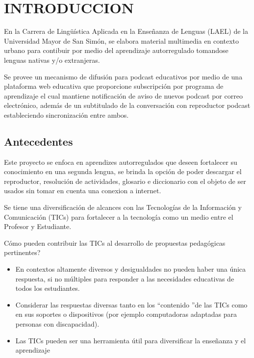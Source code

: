\chapter{INTRODUCCION}

En la Carrera de Ling\"{u}\'{i}stica Aplicada en la Ense\~{n}anza de Lenguas 
(LAEL) de la Universidad Mayor de San Sim\'{o}n, se elabora material
multimedia en contexto urbano para contibuir por medio del aprendizaje 
autorregulado tomandose lenguas nativas y/o extranjeras.

Se provee un mecanismo de difusi\'{o}n para podcast educativos por medio de una
plataforma web educativa que proporcione subscripci\'{o}n por programa de 
aprendizaje el cual mantiene notificaci\'{o}n de aviso de nuevos podcast por 
correo electr\'{o}nico, adem\'{a}s de un subtitulado de la conversaci\'{o}n 
con reproductor podcast estableciendo sincronizaci\'{o}n entre ambos.

\section{Antecedentes}

Este proyecto se enfoca en aprendizes autorregulados que deseen fortalecer
su conocimiento en una segunda lengua, se brinda la opci\'{o}n de poder 
descargar el reproductor, resoluci\'{o}n de actividades, glosario e diccionario
con el objeto de ser usados sin tomar en cuenta una conexion a internet. 

Se tiene una diversificaci\'{o}n de alcances con las Tecnolog\'{i}as de la 
Informaci\'{o}n y Comunicaci\'{o}n (TICs) para fortalecer a la
tecnolog\'{i}a como un medio entre el Profesor y Estudiante.

\textquestiondown C\'{o}mo pueden contribuir las TICs al desarrollo de propuestas
pedag\'{o}gicas pertinentes? 
\cite{severin2013enfoques}

\begin{itemize}

\item En contextos altamente diversos y desigualdades no pueden haber una 
\'{u}nica respuesta, si no m\'{u}ltiples para responder a las necesidades 
educativas de todos los estudiantes.
\item Considerar las respuestas diversas tanto en los \textquotedblleft contenido
\textquotedblright  de las TICs como en sus soportes o dispositivos (por ejemplo
computadoras adaptadas para personas con discapacidad).
\item Las TICs pueden ser una herramienta \'{u}til para diversificar la 
ense\~{n}anza y el aprendizaje

\end{itemize}

